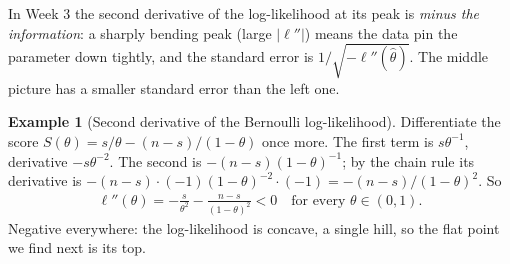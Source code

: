 \documentclass[11pt]{article}
\theoremstyle{definition}
\newtheorem{example}{Example}[section]
\newcommand{\loglik}{\ell}
\begin{document}
\begin{center}
\end{center}

\begin{inthecourse}
In Week 3 the second derivative of the log-likelihood at its peak is
\emph{minus the information}: a sharply bending peak (large
$|\loglik''|$) means the data pin the parameter down tightly, and the
standard error is $1/\sqrt{-\loglik''(\hat\theta)}$. The middle picture
has a smaller standard error than the left one.
\end{inthecourse}

\begin{example}[Second derivative of the Bernoulli log-likelihood]
Differentiate the score $S(\theta) = s/\theta - (n-s)/(1-\theta)$ once
more. The first term is $s\theta^{-1}$, derivative $-s\theta^{-2}$. The
second is $-(n-s)(1-\theta)^{-1}$; by the chain rule its derivative is
$-(n-s)\cdot(-1)(1-\theta)^{-2}\cdot(-1) = -(n-s)/(1-\theta)^2$. So
\begin{align*}
  \loglik''(\theta) = -\frac{s}{\theta^2} - \frac{n-s}{(1-\theta)^2} < 0
  \quad\text{for every } \theta \in (0,1).
\end{align*}
Negative everywhere: the log-likelihood is concave, a single hill, so the
flat point we find next is its top.
\end{example}
\end{document}
